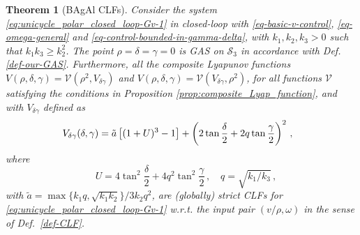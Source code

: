\documentclass[journal,twoside,web]{ieeecolor}
\newtheorem{theorem}{Theorem}
\theoremstyle{definition}
\begin{document}
\begin{theorem}[BAgAl CLFs] 
\label{thm:unicycle_CLF_Bagal}
Consider the system \eqref{eq:unicycle_polar_closed_loop-Gv-1} in closed-loop with \eqref{eq-basic-v-control}, \eqref{eq-omega-general} and \eqref{eq-control-bounded-in-gamma-delta}, with  $k_1, k_2, k_3 > 0$ such that  
$k_1 k_3\geq k_2^2$.
The point $\rho = \delta = \gamma = 0$ is GAS on $\mathcal{S}_3$ in accordance with Def. \ref{def-our-GAS}.
Furthermore, all the composite Lyapunov functions $V(\rho, \delta, \gamma) = \mathcal{V}(\rho^2, V_{\delta \gamma})$ and $V(\rho, \delta, \gamma) = \mathcal{V}(V_{\delta \gamma},\rho^2)$, for all functions $\mathcal{V}$ satisfying the conditions in Proposition \ref{prop:composite_Lyap_function}, and with $V_{\delta \gamma}$ defined as
\begin{equation}
\label{eq:CLF_ABounD_delta_gamma}
\hspace*{-0.25cm}
V_{\delta \gamma}(\delta,\gamma) =  \tilde{a} \left[ (1+U)^3 -1\right]
+   \left (2\tan\frac{\delta}{2} + 2q\tan\frac{\gamma}{2} \right)^2 \,,
\end{equation}
where
\begin{equation}
\quad U= 4\tan^2 \frac{\delta}{2}+ 4q^2 \tan^2 \frac{\gamma}{2}\,, \quad q = \sqrt{k_1 / k_3} \,,
\end{equation}
with $\tilde{a} = \max\{k_1 q, \sqrt{k_1 k_2} \} / 3k_2q^2$, 
are (globally) strict CLFs for \eqref{eq:unicycle_polar_closed_loop-Gv-1} w.r.t. the input pair $(v/\rho,\omega)$ in the sense of Def.~\ref{def-CLF}. 
\end{theorem}
\end{document}
